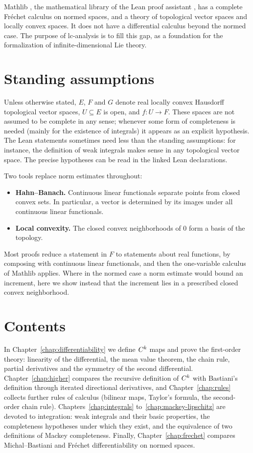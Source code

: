 Mathlib \cite{mC20}, the mathematical library of the Lean proof assistant \cite{dMU21}, has a
complete Fréchet calculus on normed spaces, and a theory of topological vector spaces and
locally convex spaces. It does not have a differential calculus beyond the normed case. The
purpose of lc-analysis is to fill this gap, as a foundation for the formalization of
infinite-dimensional Lie theory.

\section*{Standing assumptions}

Unless otherwise stated, $E$, $F$ and $G$ denote real locally convex Hausdorff topological
vector spaces, $U \subseteq E$ is open, and $f \colon U \to F$. These spaces are not assumed to
be complete in any sense; whenever some form of completeness is needed (mainly for the
existence of integrals) it appears as an explicit hypothesis. The Lean statements sometimes
need less than the standing assumptions: for instance, the definition of weak integrals makes
sense in any topological vector space. The precise hypotheses can be read in the linked Lean
declarations.

Two tools replace norm estimates throughout:
\begin{itemize}
  \item \textbf{Hahn--Banach.} Continuous linear functionals separate points from closed convex
  sets. In particular, a vector is determined by its images under all continuous linear
  functionals.
  \item \textbf{Local convexity.} The closed convex neighborhoods of $0$ form a basis of the
  topology.
\end{itemize}
Most proofs reduce a statement in $F$ to statements about real functions, by composing with
continuous linear functionals, and then the one-variable calculus of Mathlib applies. Where in
the normed case a norm estimate would bound an increment, here we show instead that the
increment lies in a prescribed closed convex neighborhood.

\section*{Contents}

In Chapter~\ref{chap:differentiability} we define $C^{k}$ maps and prove the first-order
theory: linearity of the differential, the mean value theorem, the chain rule, partial
derivatives and the symmetry of the second differential. Chapter~\ref{chap:higher} compares
the recursive definition of $C^{k}$ with Bastiani's definition through iterated directional
derivatives, and Chapter~\ref{chap:rules} collects further rules of calculus (bilinear maps,
Taylor's formula, the second-order chain rule). Chapters~\ref{chap:integrals}
to~\ref{chap:mackey-lipschitz} are devoted to integration: weak integrals and their basic
properties, the completeness hypotheses under which they exist, and the equivalence of two
definitions of Mackey completeness. Finally, Chapter~\ref{chap:frechet} compares
Michal--Bastiani and Fréchet differentiability on normed spaces.

